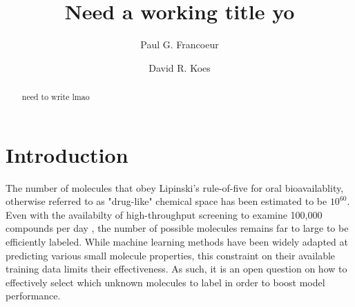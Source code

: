 \documentclass[journal=jmcmar,manuscript=article]{achemso}
\author{Paul G. Francoeur}
\author{David R. Koes}
\affiliation[Pitt]{Department of Computational and Systems Biology, University of Pittsburgh, Pittsburgh, PA 15260}
\title[TODO]{Need a working title yo}
\begin{document}





\begin{abstract}
need to write lmao

\end{abstract}


\section{Introduction}

The number of molecules that obey Lipinski's rule-of-five for oral bioavailablity, otherwise referred to as "drug-like" chemical space has been estimated to be $10^{60}$. \cite{lipinski1997experimental,bohacekChemSpace} Even with the availabilty of high-throughput screening to examine 100,000 compounds per day \cite{htsnumbers}, the number of possible molecules remains far to large to be efficiently labeled. While machine learning methods have been widely adapted at predicting various small molecule properties, this constraint on their available training data limits their effectiveness. As such, it is an open question on how to effectively select which unknown molecules to label in order to boost model performance.
\end{document}
